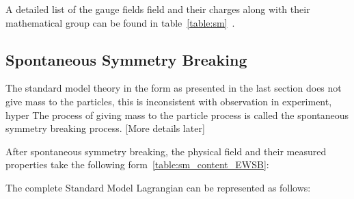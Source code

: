 

A detailed list of the gauge fields field and their charges along with their mathematical group can be found in table~\ref{table:sm}~\cite{Antrim:2699575}. 

\subsection*{Spontaneous Symmetry Breaking}
The standard model theory in the form as presented in the last section does not give mass to the particles, this is inconsistent with observation in experiment, hyper The process of giving mass to the particle process is called the spontaneous symmetry breaking process.
[More details later]


After spontaneous symmetry breaking, the physical field and their measured properties take the following form~\ref{table:sm_content_EWSB}:
    
    The complete Standard Model Lagrangian can be represented as follows:

